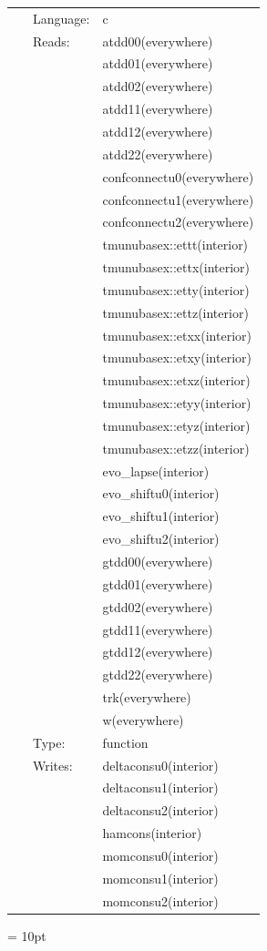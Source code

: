  \begin{tabular*}{160mm}{cll} 
~ & Language:  & c \\ 
~ & Reads:  & atdd00(everywhere) \\ 
~& ~ &atdd01(everywhere)\\ 
~& ~ &atdd02(everywhere)\\ 
~& ~ &atdd11(everywhere)\\ 
~& ~ &atdd12(everywhere)\\ 
~& ~ &atdd22(everywhere)\\ 
~& ~ &confconnectu0(everywhere)\\ 
~& ~ &confconnectu1(everywhere)\\ 
~& ~ &confconnectu2(everywhere)\\ 
~& ~ &tmunubasex::ettt(interior)\\ 
~& ~ &tmunubasex::ettx(interior)\\ 
~& ~ &tmunubasex::etty(interior)\\ 
~& ~ &tmunubasex::ettz(interior)\\ 
~& ~ &tmunubasex::etxx(interior)\\ 
~& ~ &tmunubasex::etxy(interior)\\ 
~& ~ &tmunubasex::etxz(interior)\\ 
~& ~ &tmunubasex::etyy(interior)\\ 
~& ~ &tmunubasex::etyz(interior)\\ 
~& ~ &tmunubasex::etzz(interior)\\ 
~& ~ &evo\_lapse(interior)\\ 
~& ~ &evo\_shiftu0(interior)\\ 
~& ~ &evo\_shiftu1(interior)\\ 
~& ~ &evo\_shiftu2(interior)\\ 
~& ~ &gtdd00(everywhere)\\ 
~& ~ &gtdd01(everywhere)\\ 
~& ~ &gtdd02(everywhere)\\ 
~& ~ &gtdd11(everywhere)\\ 
~& ~ &gtdd12(everywhere)\\ 
~& ~ &gtdd22(everywhere)\\ 
~& ~ &trk(everywhere)\\ 
~& ~ &w(everywhere)\\ 
~ & Type:  & function \\ 
~ & Writes:  & deltaconsu0(interior) \\ 
~& ~ &deltaconsu1(interior)\\ 
~& ~ &deltaconsu2(interior)\\ 
~& ~ &hamcons(interior)\\ 
~& ~ &momconsu0(interior)\\ 
~& ~ &momconsu1(interior)\\ 
~& ~ &momconsu2(interior)\\ 
\end{tabular*} 



\vspace{5mm}\parskip = 10pt 
